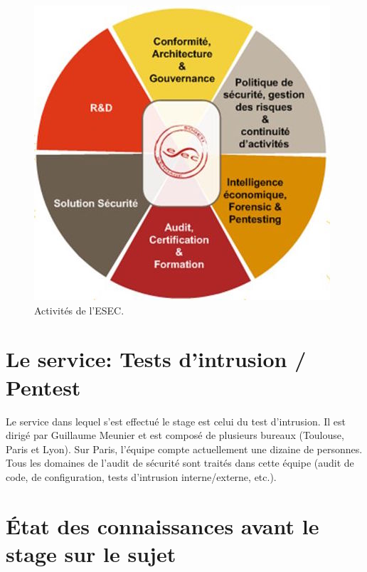 \begin{figure}[h]
    \centering
    \includegraphics[scale=0.5]{activities.jpg}
    \caption{Activités de l'ESEC.}
\end{figure}

\section*{Le service: Tests d'intrusion / Pentest}
Le service dans lequel s'est effectué le stage est celui du test d'intrusion. Il est dirigé par Guillaume Meunier et est composé
de plusieurs bureaux (Toulouse, Paris et Lyon). Sur Paris, l'équipe compte actuellement une dizaine de personnes. Tous les domaines de l'audit de
sécurité sont traités dans cette équipe (audit de code, de configuration, tests d'intrusion interne/externe, etc.).

\subparagraph{}

\section*{État des connaissances avant le stage sur le sujet}
